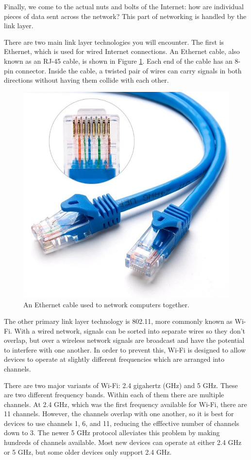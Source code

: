 Finally, we come to the actual nuts and bolts of the Internet: how are individual pieces of data sent across the network? This part of networking is handled by the link layer.

There are two main link layer technologies you will encounter. The first is Ethernet, which is used for wired Internet connections. An Ethernet cable, also known as an RJ-45 cable, is shown in Figure \ref{fig:ethernet}. Each end of the cable has an 8-pin connector. Inside the cable, a twisted pair of wires can carry signals in both directions without having them collide with each other.

\begin{figure}
    \centering
    \includegraphics[width=.6\linewidth]{images/ethernet.jpg}
    \caption{An Ethernet cable used to network computers together.}
    \label{fig:ethernet}
\end{figure}

The other primary link layer technology is 802.11, more commonly known as Wi-Fi. With a wired network, signals can be sorted into separate wires so they don't overlap, but over a wireless network signals are broadcast and have the potential to interfere with one another. In order to prevent this, Wi-Fi is designed to allow devices to operate at slightly different frequencies which are arranged into channels.

There are two major variants of Wi-Fi: 2.4 gigahertz (GHz) and 5 GHz. These are two different frequency bands. Within each of them there are multiple channels. At 2.4 GHz, which was the first frequency available for Wi-Fi, there are 11 channels. However, the channels overlap with one another, so it is best for devices to use channels 1, 6, and 11, reducing the efffective number of channels down to 3. The newer 5 GHz protocol alleviates this problem by making hundreds of channels available. Most new devices can operate at either 2.4 GHz or 5 GHz, but some older devices only support 2.4 GHz.


